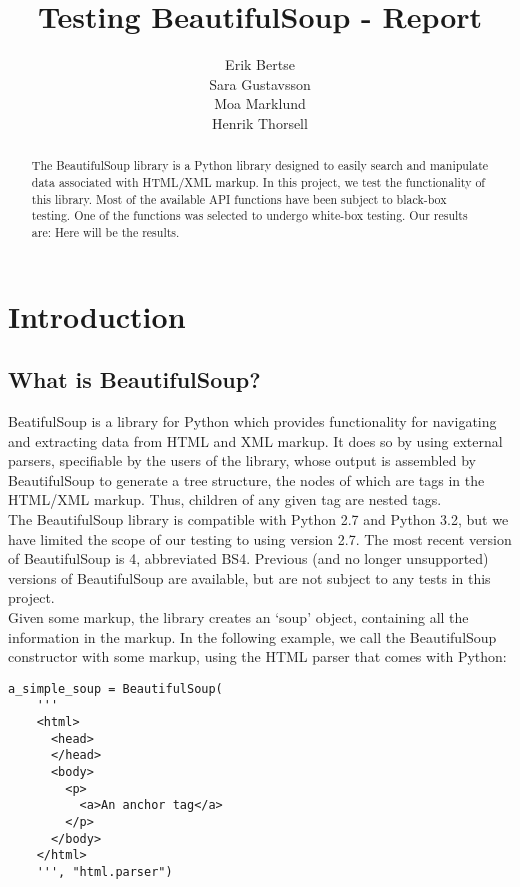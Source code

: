 \documentclass[10pt]{article}
\title{Testing BeautifulSoup - Report}
\author{Erik Bertse \\ Sara Gustavsson \\ Moa Marklund \\ Henrik Thorsell}
\begin{document}
\maketitle

\begin{abstract}
	The BeautifulSoup library is a Python library designed to easily search and manipulate data associated with HTML/XML markup. In this project, we test the functionality of this library. Most of the available API functions have been subject to black-box testing. One of the functions was selected to undergo white-box testing. Our results are: Here will be the results.
\end{abstract}

\section{Introduction}

\subsection{What is BeautifulSoup?}
 BeatifulSoup is a library for Python which provides functionality for navigating and extracting data from HTML and XML markup. It does so by using external parsers, specifiable by the users of the library, whose output is assembled by BeautifulSoup to generate a tree structure, the nodes of which are tags in the HTML/XML markup. Thus, children of any given tag are nested tags. \\

 The BeautifulSoup library is compatible with Python 2.7 and Python 3.2, but we have limited the scope of our testing to using version 2.7. The most recent version of BeautifulSoup is 4, abbreviated BS4. Previous (and no longer unsupported) versions of BeautifulSoup are available, but are not subject to any tests in this project.  \\

Given some markup, the library creates an `soup' object, containing all the information in the markup. In the following example, we call the BeautifulSoup constructor with some markup, using the HTML parser that comes with Python: 
\newpage

\begin{lstlisting}[style = pythonstyle]
a_simple_soup = BeautifulSoup(
    '''
    <html>
      <head>
      </head>
      <body>
        <p>
          <a>An anchor tag</a>
        </p>
      </body>
    </html>
    ''', "html.parser")
\end{lstlisting}
\end{document}
